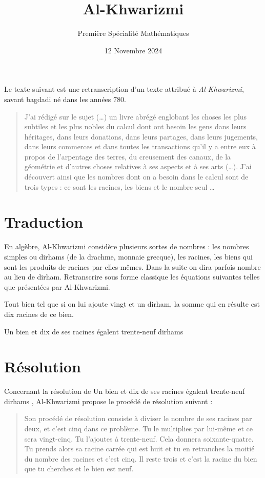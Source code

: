 \documentclass{article}
\title{Al-Khwarizmi}
\date{12 Novembre 2024}
\author{Première Spécialité Mathématiques}
\begin{document}
\maketitle

Le texte suivant est une retranscription d'un texte attribué à \emph{Al-Khwarizmi}, savant bagdadi né dans les années $780$.

\begin{quote}
\og J'ai rédigé sur le sujet (\dots) un livre abrégé englobant les choses les plus subtiles et les plus nobles du calcul dont ont besoin les gens dans leurs héritages, dans leurs donations, dans leurs partages, dans leurs jugements, dans leurs commerces et dans toutes les transactions qu'il y a entre eux à propos de l'arpentage des terres, du creusement des canaux, de la géométrie et d'autres choses relatives à ses aspects et à ses arts (\dots). J'ai découvert ainsi que les nombres dont on a besoin dans le calcul sont de trois types : ce sont les racines, les biens et le nombre seul \dots \fg
\end{quote}

\section{Traduction}
En algèbre, Al-Khwarizmi considère plusieurs sortes de nombres : les nombres simples ou dirhams (de la drachme, monnaie grecque), les racines, les biens qui sont les produits de racines par elles-mêmes. Dans la suite on dira parfois nombre au lieu de dirham. Retranscrire sous forme classique les équations suivantes telles que présentées par Al-Khwarizmi.

\begin{enumquestions}
\item \og Tout bien tel que si on lui ajoute vingt et un dirham, la somme qui en résulte est dix racines de ce bien.\fg
\item \og Un bien et dix de ses racines égalent trente-neuf dirhams \fg
\end{enumquestions}

\emptybox{2cm}

\section{Résolution}
Concernant la résolution de \og Un bien et dix de ses racines égalent trente-neuf dirhams \fg, Al-Khwarizmi propose le procédé de résolution suivant :

\begin{quote}
\og Son procédé de résolution consiste à diviser le nombre de ses racines par deux, et c'est cinq dans ce problème. Tu le multiplies par lui-même et ce sera vingt-cinq. Tu l'ajoutes à trente-neuf. Cela donnera soixante-quatre. Tu prends alors sa racine carrée qui est huit et tu en retranches la moitié du nombre des racines et c'est cinq. Il reste trois et c'est la racine du bien que tu cherches et le bien est neuf. \fg
\end{quote}
\end{document}
